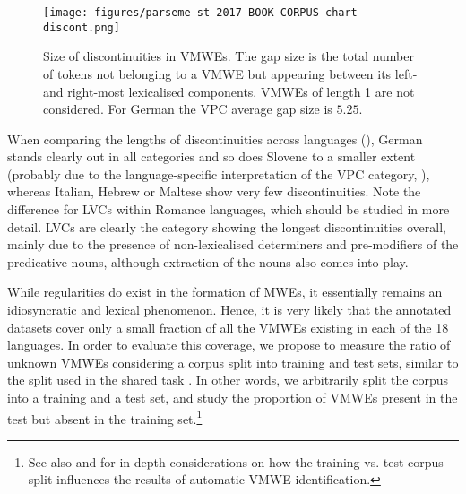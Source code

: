 \documentclass[output=paper,
modfonts,
]{langscibook}
\begin{document}
\begin{figure}
\centering
\texttt{[image: figures/parseme-st-2017-BOOK-CORPUS-chart-discont.png]}
\caption{Size of discontinuities in VMWEs. The gap size is the total number of tokens not belonging to a VMWE but appearing between its left- and  right-most lexicalised components.
VMWEs of length 1 are not considered. For German the VPC average gap size is $5.25$.}
\label{fig:gaps-per-category}
\end{figure}
When comparing the lengths of discontinuities across languages (), German stands clearly out %
in all categories %
and so does Slovene to a smaller extent (probably due to the language-specific interpretation of the VPC category, ), whereas Italian, Hebrew or Maltese show very few discontinuities. Note the difference for LVCs within Romance languages, which should be studied in more detail. %
LVCs are clearly the category showing the longest discontinuities overall, mainly due to the presence of non-lexicalised determiners and pre-modifiers of the predicative nouns, although extraction of the nouns also comes into play.


While regularities do exist in the formation of MWEs, it essentially remains an idiosyncratic and lexical phenomenon. Hence, it is very likely that the annotated datasets cover only a small fraction of all the VMWEs %
existing in each of the 18 languages. 
In order to evaluate this coverage, we propose to measure the ratio of unknown VMWEs considering a corpus split into training and test sets, similar to the split used in the shared task \citep{MWEWorkshop}. In other words, we arbitrarily split the corpus into a training and a test set, and study 
 the proportion of VMWEs present in the test but absent in the training set.\footnote{See also  and  for in-depth considerations on how the training vs. test corpus split influences the results of automatic VMWE identification.}
\end{document}
